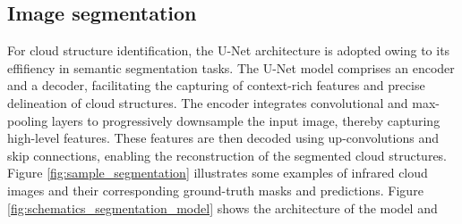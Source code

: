 \documentclass[amt, article]{copernicus}
\begin{document}
\subsection{Image segmentation}

For cloud structure identification, the U-Net architecture is adopted owing to its effifiency in semantic segmentation tasks. The U-Net model comprises an encoder and a decoder, facilitating the capturing of context-rich features and precise delineation of cloud structures. The encoder integrates convolutional and max-pooling layers to progressively downsample the input image, thereby capturing high-level features. These features are then decoded using up-convolutions and skip connections, enabling the reconstruction of the segmented cloud structures.  Figure \ref{fig:sample_segmentation} illustrates some examples of infrared cloud images and their corresponding ground-truth masks and predictions. Figure \ref{fig:schematics_segmentation_model} shows the architecture of the model and
\end{document}
